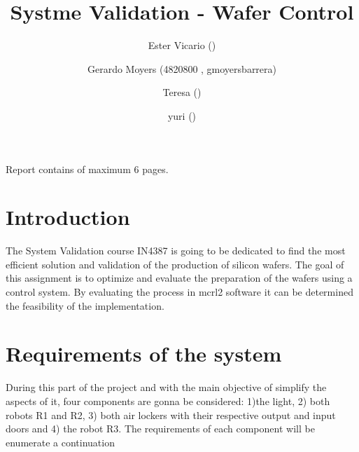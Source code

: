 \documentclass[twocolumn]{article}
\title{\large{\textbf{Systme Validation - Wafer Control}}}
\author{
    \small Ester Vicario ()
    \and \small Gerardo Moyers (4820800 , gmoyersbarrera)
    \and \small Teresa ()
      \and \small yuri ()
}
\date{}
\begin{document}
\maketitle

\begin{center}
    \footnotesize{Report contains \pageref{LastPage} of maximum 6 pages.}
\end{center}

\section{Introduction}
The System Validation course IN4387 is going to be dedicated to find the most efficient solution and validation of the production of silicon wafers. The goal of this assignment is to optimize and evaluate the preparation of the wafers using a control system. By evaluating the process in mcrl2 software it can be determined the feasibility of the implementation. 



\section{Requirements of the system}
During this part of the project and with the main objective of simplify the aspects of it, four components are gonna be considered: 1)the light, 2) both robots R1 and R2, 3) both air lockers with their respective output and input doors and 4) the robot R3.
The requirements of each component will be enumerate a continuation 
\end{document}
